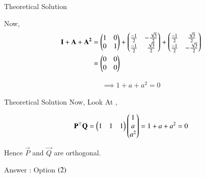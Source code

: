 \documentclass{beamer}
\begin{document}
\begin{frame}{Theoretical Solution}

Now, 
\begin{align}
    \mathbf{I} + \mathbf{A} + \mathbf{A^2} &= \begin{pmatrix}1&0\\0&1\end{pmatrix} + \begin{pmatrix}\frac{-1}{2}&-\frac{\sqrt{3}}{2}\\\frac{-1}{2} & \frac{\sqrt{3}}{2}\end{pmatrix} + \begin{pmatrix}\frac{-1}{2}&\frac{\sqrt{3}}{2}\\\frac{-1}{2} & -\frac{\sqrt{3}}{2}\end{pmatrix}\\ 
    &= \begin{pmatrix}0&0\\0&0\end{pmatrix}
\end{align}

\begin{align}
    \implies 1 + a + a^2 = 0 
\end{align}
\end{frame}
\begin{frame}{Theoretical Solution}
Now, Look At , 

\begin{align}
    \mathbf{P}^{\top}\mathbf{Q} = \begin{pmatrix}1&1&1\end{pmatrix}\begin{pmatrix}1\\a\\a^2\end{pmatrix} = 1 + a + a^2 = 0 
\end{align}

Hence $\vec{P}$ and $\vec{Q}$ are orthogonal. 

Answer  : Option $\left(2\right)$
\end{frame}
\end{document}
